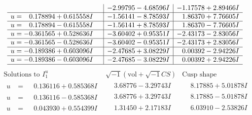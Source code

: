 \documentclass[1p]{elsarticle_modified}
\theoremstyle{definition}
\newcommand{\I}{\sqrt{-1}}
\begin{document}
$$\begin{array}{c|c|c}
 & -2.99795 - 4.68596 I & -1.17578 + 2.89466 I \\ \hline\begin{aligned}
u &= \phantom{-}0.178894 + 0.615558 I\end{aligned}
 & -1.56141 - 8.78593 I & \phantom{-}1.86370 + 7.76605 I \\ \hline\begin{aligned}
u &= \phantom{-}0.178894 - 0.615558 I\end{aligned}
 & -1.56141 + 8.78593 I & \phantom{-}1.86370 - 7.76605 I \\ \hline\begin{aligned}
u &= -0.361565 + 0.528636 I\end{aligned}
 & -3.60402 + 0.95351 I & -2.43173 - 2.83056 I \\ \hline\begin{aligned}
u &= -0.361565 - 0.528636 I\end{aligned}
 & -3.60402 - 0.95351 I & -2.43173 + 2.83056 I \\ \hline\begin{aligned}
u &= -0.189386 + 0.603096 I\end{aligned}
 & -2.47685 + 3.08229 I & \phantom{-}0.00392 - 2.94226 I \\ \hline\begin{aligned}
u &= -0.189386 - 0.603096 I\end{aligned}
 & -2.47685 - 3.08229 I & \phantom{-}0.00392 + 2.94226 I\\
 \hline 
 \end{array}$$\newpage$$\begin{array}{c|c|c}  
\text{Solutions to }I^u_{1}& \I (\text{vol} + \sqrt{-1}CS) & \text{Cusp shape}\\
 \hline 
\begin{aligned}
u &= \phantom{-}0.136116 + 0.585368 I\end{aligned}
 & \phantom{-}3.68776 - 3.29743 I & \phantom{-}8.17885 + 5.01878 I \\ \hline\begin{aligned}
u &= \phantom{-}0.136116 - 0.585368 I\end{aligned}
 & \phantom{-}3.68776 + 3.29743 I & \phantom{-}8.17885 - 5.01878 I \\ \hline\begin{aligned}
u &= \phantom{-}0.043930 + 0.554399 I\end{aligned}
 & \phantom{-}1.31450 + 2.17183 I & \phantom{-}6.03910 - 2.53826 I \\ \hline\begin{aligned}

\end{aligned}
\end{array}$$
\end{document}
